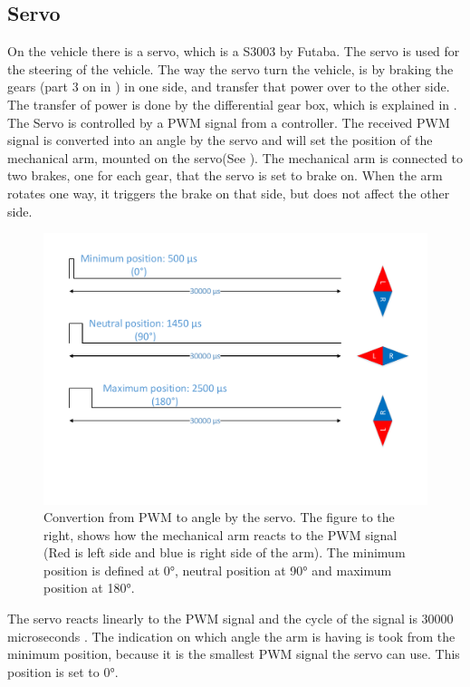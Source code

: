 \subsection{Servo} \label{Servo}
On the vehicle there is a servo, which is a S3003 by Futaba. 
The servo is used for the steering of the vehicle. The way the servo turn the vehicle, is by braking the gears (part 3 on  in ) in one side, and transfer that power over to the other side. The transfer of power is done by the differential gear box, which is explained in .
The Servo is controlled by a PWM signal from a controller. The received PWM signal is converted into an angle by the servo and will set the position of the mechanical arm, mounted on the servo(See ). The mechanical arm is connected to two brakes, one for each gear, that the servo is set to brake on. When the arm rotates one way, it triggers the brake on that side, but does not affect the other side.

\begin{figure}[H]
	\centering
	\includegraphics[scale=0.6]{figures/TimeVSangle.pdf}
	\caption{Convertion from PWM to angle by the servo. The figure to the right, shows how the mechanical arm reacts to the PWM signal (Red is left side and blue is right side of the arm). The minimum position is defined at 0°, neutral position at 90° and maximum position at 180°.}
	\label{timeVSangle}
\end{figure}

The servo reacts linearly to the PWM signal and the cycle of the signal is 30000 microseconds . The indication on which angle the arm is having is took from the minimum position, because it is the smallest PWM signal the servo can use. This position is set to 0°.
 
